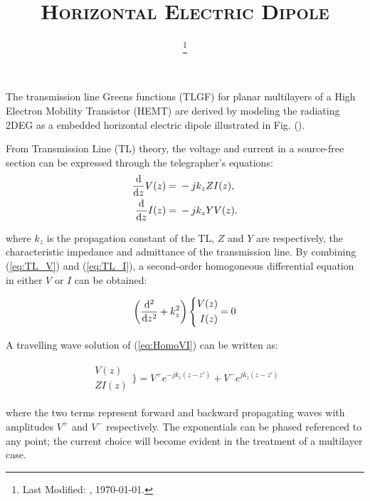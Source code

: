 \documentclass[11pt]{article}
\renewcommand{\^}{\hat}  %
\begin{document}
  \title{\textsc{Horizontal Electric Dipole}\\}
  \date{\footnote{Last Modified: \currenttime, \today.}}
  \maketitle
  The transmission line Greens functions (TLGF) for planar multilayers of a High Electron Mobility Transistor (HEMT) are derived by modeling the radiating 2DEG as a embedded horizontal electric dipole illustrated in Fig. ().

  From Transmission Line (TL) theory, the voltage and current in a source-free section can be expressed through the telegrapher's equations:
  \begin{subequations}
    \begin{align}
      \dv{}{z}{V(z)} ={}& -jk_z Z I(z),
      \label{eq:TL_V}\\
      \dv{}{z}{I(z)} ={}& -jk_z Y V(z).
      \label{eq:TL_I}
    \end{align}
    \label{eq:TL}
  \end{subequations}

where $k_z$ is the propagation constant of the TL, $Z$ and $Y$ are respectively, the characteristic impedance and admittance of the transmission line. By combining (\ref{eq:TL_V}) and (\ref{eq:TL_I}), a second-order homogoneous differential equation in either $V$ or $I$ can be obtained:

\begin{align}
  \left( \dv[2]{}{z} + k_z^2 \right) \Bigg \{
  \begin{split}
    V(z)\\
    I(z)
  \end{split} = 0
    \label{eq:HomoVI}
\end{align}

A travelling wave solution of (\ref{eq:HomoVI}) can be written as:

\begin{align}
  \begin{split}
    V(z)\\
    Z I(z)
  \end{split} \Bigg \}= V^+ e^{-jk_z (z-z')} + V^- e^{jk_z (z-z')}
  \label{eq:homo_sol}
\end{align}

where the two terms represent forward and backward propagating waves with amplitudes $V^+$ and $V^-$ respectively. The exponentials can be phased referenced to any point; the current choice will become evident in the treatment of a multilayer case.
\end{document}
